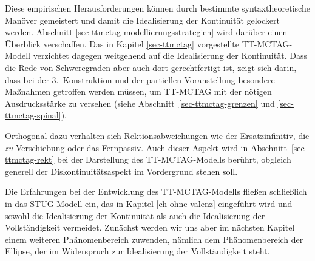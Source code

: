 Diese empirischen Herausforderungen können durch bestimmte syntaxtheoretische Manöver gemeistert und damit die Idealisierung der Kontinuität gelockert werden. Abschnitt \ref{sec-ttmctag-modellierungsstrategien} wird darüber einen Überblick verschaffen. Das in Kapitel \ref{sec-ttmctag} vorgestellte TT-MCTAG-Modell verzichtet dagegen weitgehend auf die Idealisierung der Kontinuität. Dass die Rede von Schweregraden aber auch dort gerechtfertigt ist, zeigt sich darin, dass bei der 3.~Konstruktion und der partiellen Voranstellung besondere Ma\ss nahmen getroffen werden müssen, um TT-MCTAG mit der nötigen Ausdrucksstärke zu versehen (siehe Abschnitt~\ref{sec-ttmctag-grenzen} und \ref{sec-ttmctag-spinal}). 

Orthogonal dazu verhalten sich Rektionsabweichungen wie der Ersatzinfinitiv, die \emph{zu}-Ver\-schie\-bung oder das Fernpassiv. Auch dieser Aspekt wird in Abschnitt~\ref{sec-ttmctag-rekt} bei der Darstellung des TT-MCTAG-Modells berührt, obgleich generell der Diskontinuitätsaspekt im Vordergrund stehen soll.

Die Erfahrungen bei der Entwicklung des TT-MCTAG-Modells flie\ss en schlie\ss lich in das STUG-Modell  ein, das in Kapitel \ref{ch-ohne-valenz} eingeführt wird und sowohl die Idealisierung der Kontinuität als auch die Idealisierung der Vollständigkeit vermeidet. Zunächst werden wir uns aber im nächsten Kapitel einem weiteren Phänomenbereich zuwenden, nämlich dem Phänomenbereich der Ellipse, der im Widerspruch zur Idealisierung der Vollständigkeit steht.





 